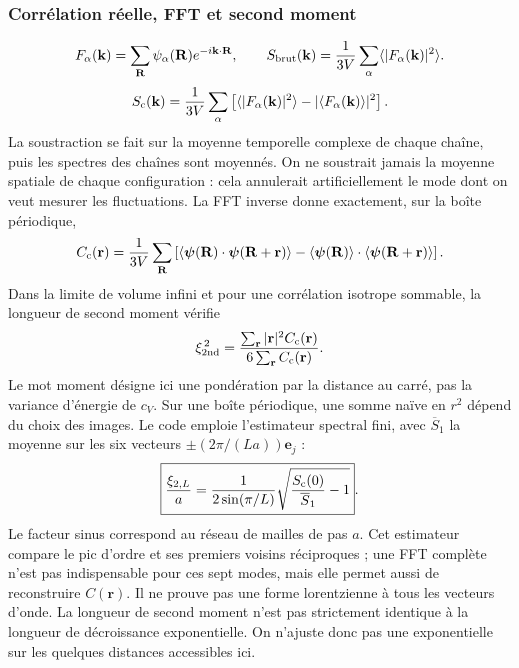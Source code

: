 \subsubsection{Corrélation réelle, FFT et second moment}
\[F_\alpha(\mathbf k)=\sum_{\mathbf R}\psi_\alpha(\mathbf R)e^{-i\mathbf k\cdot\mathbf R},\qquad S_{\rm brut}(\mathbf k)=\frac1{3V}\sum_\alpha\langle|F_\alpha(\mathbf k)|^2\rangle.\]
\[S_{\rm c}(\mathbf k)=\frac1{3V}\sum_\alpha\left[\langle|F_\alpha(\mathbf k)|^2\rangle-|\langle F_\alpha(\mathbf k)\rangle|^2\right].\]
La soustraction se fait sur la moyenne temporelle complexe de chaque chaîne, puis les spectres des chaînes sont moyennés. On ne soustrait jamais la moyenne spatiale de chaque configuration : cela annulerait artificiellement le mode dont on veut mesurer les fluctuations. La FFT inverse donne exactement, sur la boîte périodique,
\[C_{\rm c}(\mathbf r)=\frac1{3V}\sum_{\mathbf R}\left[\langle\boldsymbol\psi(\mathbf R)\cdot\boldsymbol\psi(\mathbf R+\mathbf r)\rangle-\langle\boldsymbol\psi(\mathbf R)\rangle\cdot\langle\boldsymbol\psi(\mathbf R+\mathbf r)\rangle\right].\]
Dans la limite de volume infini et pour une corrélation isotrope sommable, la longueur de second moment vérifie
\[\xi_{\rm 2nd}^{\,2}=\frac{\sum_{\mathbf r}|\mathbf r|^2C_{\rm c}(\mathbf r)}{6\sum_{\mathbf r}C_{\rm c}(\mathbf r)}.\]
Le mot moment désigne ici une pondération par la distance au carré, pas la variance d'énergie de $c_V$. Sur une boîte périodique, une somme naïve en $r^2$ dépend du choix des images. Le code emploie l'estimateur spectral fini, avec $\overline S_1$ la moyenne sur les six vecteurs $\pm(2\pi/(La))\mathbf e_j$ :
\[\boxed{\frac{\xi_{2,L}}a=\frac1{2\sin(\pi/L)}\sqrt{\frac{S_{\rm c}(0)}{\overline S_1}-1}}.\]
Le facteur sinus correspond au réseau de mailles de pas $a$. Cet estimateur compare le pic d'ordre et ses premiers voisins réciproques ; une FFT complète n'est pas indispensable pour ces sept modes, mais elle permet aussi de reconstruire $C(\mathbf r)$. Il ne prouve pas une forme lorentzienne à tous les vecteurs d'onde. La longueur de second moment n'est pas strictement identique à la longueur de décroissance exponentielle. On n'ajuste donc pas une exponentielle sur les quelques distances accessibles ici.
